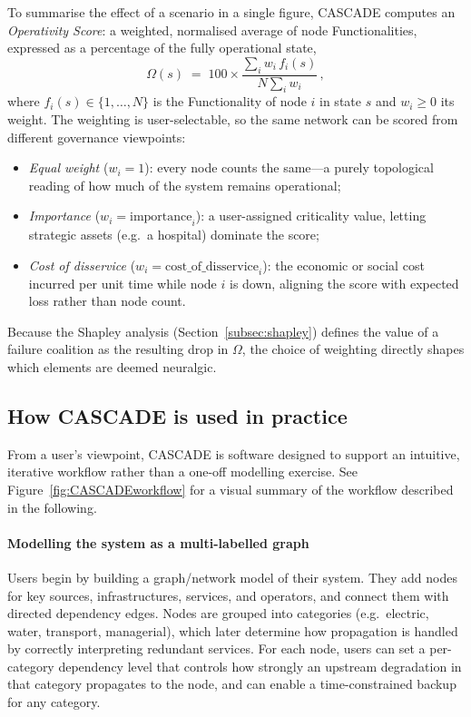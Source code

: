 \documentclass[review,12pt]{elsarticle}
\begin{document}
To summarise the effect of a scenario in a single figure, CASCADE computes an \emph{Operativity Score}: a weighted, normalised average of node Functionalities, expressed as a percentage of the fully operational state,
\[
  \Omega(s) \;=\; 100 \times
  \frac{\sum_{i} w_i\, f_i(s)}{N \sum_{i} w_i}\,,
\]
where $f_i(s)\in\{1,\ldots,N\}$ is the Functionality of node $i$ in state $s$ and
$w_i \ge 0$ its weight. The weighting is user-selectable, so the same network can
be scored from different governance viewpoints:
\begin{itemize}
  \item \emph{Equal weight} ($w_i = 1$): every node counts the same---a purely topological reading of how much of the system remains operational;
  \item \emph{Importance} ($w_i = \mathrm{importance}_i$): a user-assigned criticality value, letting strategic assets (e.g.\ a hospital) dominate the score;
  \item \emph{Cost of disservice} ($w_i = \mathrm{cost\_of\_disservice}_i$): the economic or social cost incurred per unit time while node $i$ is down, aligning the score with expected loss rather than node count.
\end{itemize}
Because the Shapley analysis (Section~\ref{subsec:shapley}) defines the value of a failure coalition as the resulting drop in $\Omega$, the choice of weighting directly shapes which elements are deemed neuralgic.

\subsection{How CASCADE is used in practice}
\label{subsec:how_cascade_is_used}


From a user's viewpoint, CASCADE is software designed to support an intuitive, iterative workflow rather than a one-off modelling exercise.
See Figure~\ref{fig:CASCADEworkflow} for a visual summary of the workflow described in the following.

\paragraph{Modelling the system as a multi-labelled graph}
Users begin by building a graph/network model of their system. They add nodes for key sources, infrastructures, services, and operators, and connect them with directed dependency edges. Nodes are grouped into categories (e.g.\ electric, water, transport, managerial), which later determine how propagation is handled by correctly interpreting redundant services. For each node, users can set a per-category dependency level that controls how strongly an upstream degradation in that category propagates to the node, and can enable a time-constrained backup for any category.
\end{document}
